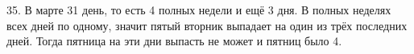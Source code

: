 35. В марте 31 день, то есть 4 полных недели и ещё 3 дня. В полных неделях всех дней по одному, значит пятый вторник выпадает на один из трёх последних дней. Тогда пятница на эти дни выпасть не может и пятниц было 4.\\

